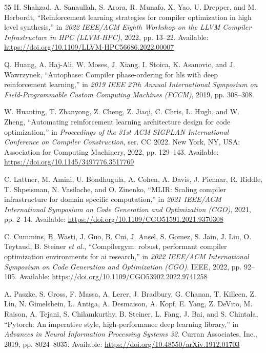 \documentclass[10pt,twocolumn]{article}
\begin{document}
\begin{thebibliography}{55}
 H. Shahzad, A. Sanaullah, S. Arora, R. Munafo, X. Yao, U. Drepper, and M. Herbordt, ``Reinforcement learning strategies for compiler optimization in high level synthesis,'' in \emph{2022 IEEE/ACM Eighth Workshop on the LLVM Compiler Infrastructure in HPC (LLVM-HPC)}, 2022, pp. 13--22. Available: \url{https://doi.org/10.1109/LLVM-HPC56686.2022.00007}

 Q. Huang, A. Haj-Ali, W. Moses, J. Xiang, I. Stoica, K. Asanovic, and J. Wawrzynek, ``Autophase: Compiler phase-ordering for hls with deep reinforcement learning,'' in \emph{2019 IEEE 27th Annual International Symposium on Field-Programmable Custom Computing Machines (FCCM)}, 2019, pp. 308--308.

 W. Huanting, T. Zhanyong, Z. Cheng, Z. Jiaqi, C. Chris, L. Hugh, and W. Zheng, ``Automating reinforcement learning architecture design for code optimization,'' in \emph{Proceedings of the 31st ACM SIGPLAN International Conference on Compiler Construction}, ser. CC 2022. New York, NY, USA: Association for Computing Machinery, 2022, pp. 129--143. Available: \url{https://doi.org/10.1145/3497776.3517769}

 C. Lattner, M. Amini, U. Bondhugula, A. Cohen, A. Davis, J. Pienaar, R. Riddle, T. Shpeisman, N. Vasilache, and O. Zinenko, ``MLIR: Scaling compiler infrastructure for domain specific computation,'' in \emph{2021 IEEE/ACM International Symposium on Code Generation and Optimization (CGO)}, 2021, pp. 2--14. Available: \url{https://doi.org/10.1109/CGO51591.2021.9370308}

 C. Cummins, B. Wasti, J. Guo, B. Cui, J. Ansel, S. Gomez, S. Jain, J. Liu, O. Teytaud, B. Steiner \emph{et al.}, ``Compilergym: robust, performant compiler optimization environments for ai research,'' in \emph{2022 IEEE/ACM International Symposium on Code Generation and Optimization (CGO)}. IEEE, 2022, pp. 92--105. Available: \url{https://doi.org/10.1109/CGO53902.2022.9741258}

 A. Paszke, S. Gross, F. Massa, A. Lerer, J. Bradbury, G. Chanan, T. Killeen, Z. Lin, N. Gimelshein, L. Antiga, A. Desmaison, A. Kopf, E. Yang, Z. DeVito, M. Raison, A. Tejani, S. Chilamkurthy, B. Steiner, L. Fang, J. Bai, and S. Chintala, ``Pytorch: An imperative style, high-performance deep learning library,'' in \emph{Advances in Neural Information Processing Systems 32}. Curran Associates, Inc., 2019, pp. 8024--8035. Available: \url{https://doi.org/10.48550/arXiv.1912.01703}


\end{thebibliography}
\end{document}
